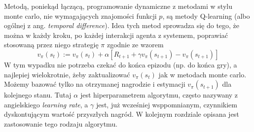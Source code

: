 \documentclass[licencjacka]{pracamgr}
\begin{document}
 Metodą, poniekąd łączącą, programowanie dynamiczne z metodami w stylu monte carlo, nie wymagających znajomości funkcji $p$, są metody Q-learning (albo ogólnej z ang. \textit{temporal difference}).  Idea tych metod sprowadza się do tego, że można w każdy kroku, po każdej interakcji agenta z systemem, poprawiać stosowaną przez niego strategię $\pi$ zgodnie ze wzorem
\begin{equation}
   v_{\pi}(s_{t}) := v_{\pi}(s_{t}) +\alpha [R_{t+1} + \gamma v_{\pi}(s_{t+1}) - v_{\pi}(s_{t+1})]
 \end{equation}
 W tym wypadku nie potrzeba czekać do końca epizodu (np. do końca gry), a najlepiej wielokrotnie, żeby zaktualizować $v_{\pi}(s_{t})$ jak w metodach monte carlo. Możemy bazować tylko na otrzymanej nagrodzie i estymacji $v_{\pi}(s_{t+1})$ dla kolejnego stanu. Tutaj $\alpha$ jest hiperparametrem algorytmu, często nazywany z angielskiego \textit{learning rate}, a $\gamma$ jest, już wcześniej wsppomnianym, czynnikiem dyskontującym wartość przyszłych nagród. W kolejnym rozdziale opisana jest zastosowanie tego rodzaju algorytmu. 
 
\end{document}
